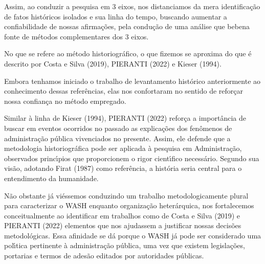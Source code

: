 \documentclass[
12pt,		%
openright,	%
twoside,  %
a4paper,			%
chapter=TITLE,		%
english,			%
french,				%
spanish,			%
brazil				%
]{USPSC-classe/USPSC}
\begin{document}
Assim, ao conduzir a pesquisa em 3 eixos, nos distanciamos da mera identifica\c{c}\~ao de fatos hist\'oricos isolados e sua linha do tempo, buscando aumentar a confiabilidade de nossas afirma\c{c}\~oes, pela condu\c{c}\~ao de uma an\'alise que \textquotedbl bebe\textquotedbl  na fonte de m\'etodos complementares dos 3 eixos.










No que se refere ao m\'etodo historiogr\'afico, o que fizemos se aproxima do que \'e descrito por   Costa e Silva (2019), PIERANTI (2022) e  Kieser (1994).










Embora tenhamos iniciado o trabalho de levantamento hist\'orico anteriormente ao conhecimento dessas refer\^encias, elas nos confortaram no sentido de refor\c{c}ar nossa confian\c{c}a no m\'etodo empregado.










Similar \`a linha de  Kieser (1994),  PIERANTI (2022) refor\c{c}a a import\^ancia de buscar em eventos ocorridos no passado as explica\c{c}\~oes dos fen\^omenos de administra\c{c}\~ao p\'ublica vivenciados no presente. Assim, ele defende que \textquotedbl a metodologia historiogr\'afica pode ser aplicada \`a pesquisa em Administra\c{c}\~ao\textquotedbl , observados princ\'{\i}pios que proporcionem o rigor cient\'{\i}fico necess\'ario. Segundo sua vis\~ao, adotando  Firat (1987) como refer\^encia, a hist\'oria seria \textquotedbl central para o entendimento da humanidade\textquotedbl .










N\~ao obstante j\'a vi\'essemos conduzindo um trabalho metodologicamente plural para caracterizar o WASH enquanto organiza\c{c}\~ao heter\'arquica, nos fortalecemos conceitualmente ao identificar em trabalhos como de Costa e Silva (2019) e  PIERANTI (2022) elementos que nos ajudassem a justificar nossas decis\~oes metodol\'ogicas. Essa afinidade se d\'a porque o WASH j\'a pode ser considerado uma pol\'{\i}tica pertinente \`a administra\c{c}\~ao p\'ublica, uma vez que existem legisla\c{c}\~oes, portarias e termos de ades\~ao editados por autoridades p\'ublicas.
\end{document}
